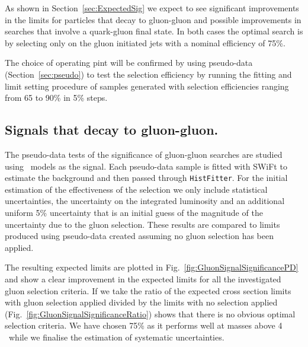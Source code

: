 
As shown in Section~\ref{sec:ExpectedSig} we expect to see significant improvements in the limits for 
particles that decay to gluon-gluon and possible improvements in searches that involve a quark-gluon 
final state. In both cases the optimal search is by selecting only on the gluon initiated jets with a 
nominal efficiency of 75\%.  

The choice of operating pint will be confirmed by using pseudo-data (Section~\ref{sec:pseudo}) to test 
the selection efficiency by 
running the fitting and limit setting procedure of samples generated with selection efficiencies ranging from 
65 to 90\% in 5\% steps. 

\subsection{Signals that decay to gluon-gluon.}


The pseudo-data tests of the significance of gluon-gluon searches are studied using  \Hprime\ models as the signal. 
Each pseudo-data sample is fitted with SWiFt to estimate the background and then passed through \texttt{HistFitter}. 
For the initial estimation of the effectiveness of the selection we only include statistical uncertainties, 
the uncertainty on the integrated luminosity and an additional uniform 5\% uncertainty that is an initial 
guess of the magnitude of the uncertainty due to the gluon selection.  These results are compared to limits 
produced using pseudo-data created assuming no gluon selection has been applied. 

The resulting expected limits are plotted in Fig.~\ref{fig:GluonSignalSignificancePD}  and show a clear 
improvement in the expected limits for all the investigated gluon selection criteria. If we take the 
ratio of the expected cross section limits with gluon selection applied divided by the limits with no 
selection applied (Fig.~\ref{fig:GluonSignalSignificanceRatio}) shows that there is no obvious optimal
selection criteria. We have chosen 75\% as it performs well at masses above 4\,\TeV\ while we finalise 
the estimation of systematic uncertainties. 


